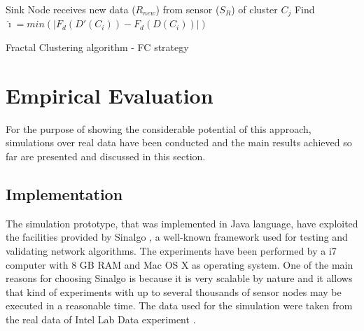 \documentclass{acm_proc_article-sp}
\begin{document}
\begin{algorithm}
 \SetAlgoLined
 \LinesNumbered
 \small
 Sink Node receives new data ($R_{new}$) from sensor ($S_{R}$) of cluster $C_j$\;
  Find $\hat{\imath} = min(|F_d(D'(C_i)) - F_d(D(C_i))|)$\;
 \caption{Fractal Clustering algorithm - FC strategy}
 \label{alg:MDFD}
\end{algorithm}


\section{Empirical Evaluation}
\label{eval}

For the purpose of showing the considerable potential of this approach,
simulations over real data have been conducted and the main results achieved so
far are presented and discussed in this section.

\subsection{Implementation}
\label{implementation}

The simulation prototype, that was implemented in Java language, have exploited the
facilities provided by Sinalgo \cite{Sinalgo2007}, a well-known framework used
for testing and validating network algorithms. The experiments have been
performed by a i7 computer with 8 GB RAM and Mac OS X as operating system.
One of the main reasons for choosing Sinalgo is because it is very scalable by
nature and it allows that kind of experiments with up to several thousands of
sensor nodes may be executed in a reasonable time. The data used for the
simulation were taken from the real data of Intel Lab Data experiment
\cite{Intel2004}.
\end{document}
